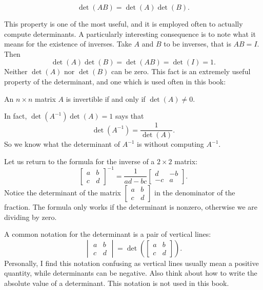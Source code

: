 \begin{theorem}
\begin{equation*}
\det(AB) = \det(A)\det(B) .
\end{equation*}
\end{theorem}

This property is one of the most useful, and it is employed often to 
actually compute determinants.  A particularly interesting consequence is to
note what it means for the existence of inverses.
Take $A$ and $B$ to be inverses, that is $AB=I$.  Then
\begin{equation*}
\det(A)\det(B) = \det(AB) = \det(I) = 1 .
\end{equation*}
Neither $\det(A)$ nor $\det(B)$ can be zero.
This fact is an extremely useful property of the determinant, and one
which is used often in this book:

\begin{theorem}
An $n \times n$ matrix $A$ is invertible if and only if $\det (A) \not= 0$.
\end{theorem}

In fact, $\det(A^{-1}) \det(A) = 1$ says that
\begin{equation*}
\det(A^{-1}) =
\frac{1}{\det(A)}.
\end{equation*}
So we know what the determinant of $A^{-1}$ is
without computing $A^{-1}$.

Let us return to the formula for the inverse of a $2 \times 2$ matrix:
\begin{equation*}
\begin{bmatrix}
a & b \\
c & d
\end{bmatrix}^{-1}
=
\frac{1}{ad-bc}
\begin{bmatrix}
d & -b \\
-c & a
\end{bmatrix} .
\end{equation*}
Notice the determinant of the matrix
$[\begin{smallmatrix}a&b\\c&d\end{smallmatrix}]$
in the denominator of the fraction.
The formula only works if the determinant is nonzero, otherwise we are
dividing by zero.

%

\medskip


A common notation for the determinant is a pair of vertical
lines:
\begin{equation*}
\begin{vmatrix}
a & b \\
c & d
\end{vmatrix}
=
\det \left(
\begin{bmatrix}
a & b \\
c & d
\end{bmatrix}
\right) .
\end{equation*}
Personally, I find this notation confusing as vertical lines usually
mean a positive quantity, while determinants can be negative.  Also
think about how to write the absolute value of a determinant.
This notation is not used in this book.

